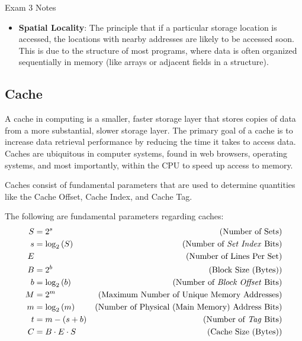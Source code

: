\begin{examnotes}{Exam 3 Notes}
    \begin{itemize}
        \item \textbf{Spatial Locality}: The principle that if a particular storage location is accessed, the locations with nearby addresses are likely to be accessed soon. This is due to the structure 
        of most programs, where data is often organized sequentially in memory (like arrays or adjacent fields in a structure).
    \end{itemize}

    \subsection*{Cache}

    A cache in computing is a smaller, faster storage layer that stores copies of data from a more substantial, slower storage layer. The primary goal of a cache is to increase data retrieval performance 
    by reducing the time it takes to access data. Caches are ubiquitous in computer systems, found in web browsers, operating systems, and most importantly, within the CPU to speed up access to memory.

    Caches consist of fundamental parameters that are used to determine quantities like the Cache Offset, Cache Index, and Cache Tag.

    \begin{center}
        \begin{highlightenv}
            The following are fundamental parameters regarding caches:
            \begin{align*}
                S & = 2^{s} & \text{(Number of Sets)} \\
                s & = \log_{2}{(S)} & \text{(Number of \textit{Set Index} Bits)} \\
                E & & \text{(Number of Lines Per Set)} \\
                B & = 2^{b} & \text{(Block Size (Bytes))} \\
                b & = \log_{2}{(b)} & \text{(Number of \textit{Block Offset} Bits)} \\
                M & = 2^{m} & \text{(Maximum Number of Unique Memory Addresses)} \\
                m & = \log_{2}{(m)} & \text{(Number of Physical (Main Memory) Address Bits)} \\
                t & = m - (s + b) & \text{(Number of \textit{Tag} Bits)} \\
                C & = B \cdot E \cdot S & \text{(Cache Size (Bytes))}
            \end{align*}
        \end{highlightenv}
    \end{center}


\end{examnotes}
